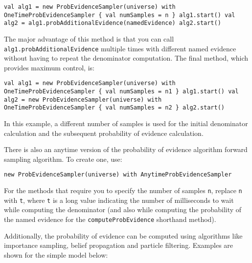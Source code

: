 \begin{flushleft}
\texttt{val alg1 = new ProbEvidenceSampler(universe) with
\newline \tab OneTimeProbEvidenceSampler \{ val numSamples = n \}
\newline alg1.start()
\newline val alg2 = alg1.probAdditionalEvidence(namedEvidence)
\newline alg2.start()
}
\end{flushleft}

The major advantage of this method is that you can call \texttt{alg1.prob\-AdditionalEvidence} multiple times with different named evidence without having to repeat the denominator computation. The final method, which provides maximum control, is:

\begin{flushleft}
\texttt{val alg1 = new ProbEvidenceSampler(universe) with
\newline \tab OneTimeProbEvidenceSampler \{ val numSamples = n1 \}
\newline alg1.start()
\newline val alg2 = new ProbEvidenceSampler(universe) with
\newline \tab OneTimeProbEvidenceSampler \{ val numSamples = n2 \}
\newline alg2.start()
}
\end{flushleft}

In this example, a different number of samples is used for the initial denominator calculation and the subsequent probability of evidence calculation.

There is also an anytime version of the probability of evidence algorithm forward sampling algorithm. To create one, use:

\begin{flushleft}
\texttt{new ProbEvidenceSampler(universe) with AnytimeProbEvidenceSampler}
\end{flushleft}

For the methods that require you to specify the number of samples \texttt{n}, replace \texttt{n} with \texttt{t}, where \texttt{t} is a long value indicating the number of milliseconds to wait while computing the denominator (and also while computing the probability of the named evidence for the \texttt{computeProbEvidence} shorthand method).

Additionally, the probability of evidence can be computed using algorithms like importance sampling, belief propagation and particle filtering. Examples are shown for the simple model below: 

